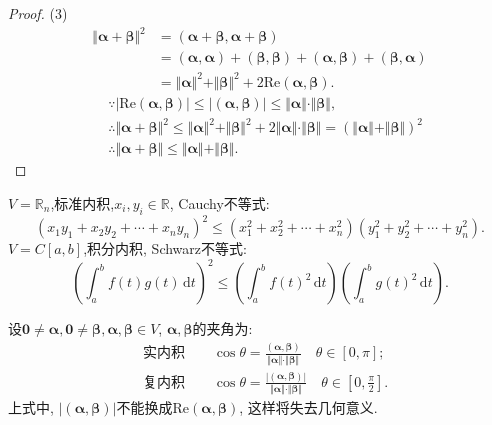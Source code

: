 \begin{proof}
  (3)
  \begin{align*}
    \Vert\bm{\alpha}+\bm{\beta}\Vert^2 & =
        (\bm{\alpha}+\bm{\beta},\bm{\alpha}+\bm{\beta})\\
                                       & = (\bm{\alpha},\bm{\alpha})+(\bm{\beta},\bm{\beta})+
                                         (\bm{\alpha},\bm{\beta})+(\bm{\beta},\bm{\alpha})\\
                                       & = \Vert\bm{\alpha}\Vert^2+\Vert\bm{\beta}\Vert^2
                                         +2\mathrm{Re}(\bm{\alpha},\bm{\beta}).
  \end{align*}
  \begin{align*}
    & \because |\mathrm{Re}(\bm{\alpha},\bm{\beta})| \leq |(\bm{\alpha},\bm{\beta})|
      \leq \Vert\bm{\alpha}\Vert\cdot\Vert\bm{\beta}\Vert,\\
    & \therefore \Vert\bm{\alpha}+\bm{\beta}\Vert^2 \leq
      \Vert\bm{\alpha}\Vert^2+\Vert\bm{\beta}\Vert^2 +
      2\Vert\bm{\alpha}\Vert\cdot\Vert\bm{\beta}\Vert =
      (\Vert\bm{\alpha}\Vert+\Vert\bm{\beta}\Vert)^2\\
    & \therefore \Vert\bm{\alpha} + \bm{\beta}\Vert \leq
      \Vert\bm{\alpha}\Vert + \Vert\bm{\beta}\Vert.
  \end{align*}
\end{proof}

\begin{example}
  $V=\mathbb{R}_n$,标准内积,$x_i,y_i \in \mathbb{R}$, 
  Cauchy不等式:
  \[ (x_1y_1+x_2y_2+\cdots+x_ny_n)^2 \leq
    (x_1^2+x_2^2+\cdots+x_n^2)(y_1^2+y_2^2+\cdots+y_n^2).\]
  $V=C[a,b]$,积分内积, Schwarz不等式:
  \[
    \left( \int_{a}^{b} f(t)g(t) \, \mathrm{d}t \right)^2 \leq
    \left( \int_{a}^{b} f(t)^2 \, \mathrm{d}t \right) \left( \int_{a}^{b} g(t)^2 \, \mathrm{d}t \right).
\]
\end{example}

\begin{definition}
  设$\bm{0} \neq \bm{\alpha}, \bm{0} \neq \bm{\beta},
  \bm{\alpha},\bm{\beta} \in V$, $\bm{\alpha},\bm{\beta}$的夹角为:
  \begin{align*}
    & \text{实内积}\qquad  \cos\theta =
      \frac{(\bm{\alpha},\bm{\beta})}{\Vert\bm{\alpha}\Vert\cdot\Vert\bm{\beta}\Vert}
      \quad \theta\in [0,\pi];\\
    & \text{复内积}\qquad  \cos\theta =
      \frac{|(\bm{\alpha},\bm{\beta})|}{\Vert\bm{\alpha}\Vert\cdot\Vert\bm{\beta}\Vert}
      \quad \theta\in [0,\frac{\pi}{2}].
  \end{align*}
  上式中, $|(\bm{\alpha},\bm{\beta})|$不能换成$\mathrm{Re}(\bm{\alpha},\bm{\beta})$,
  这样将失去几何意义.
\end{definition}

